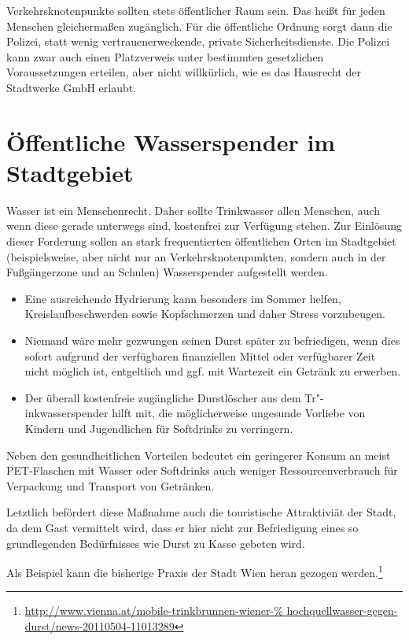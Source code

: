   Verkehrsknotenpunkte sollten stets öffentlicher Raum sein. Das heißt für 
  jeden Menschen gleichermaßen zugänglich. Für die öffentliche Ordnung sorgt 
  dann die Polizei, statt wenig vertrauenerweckende, private
  Sicherheitsdienste. Die Polizei kann zwar auch einen Platzverweis unter 
  bestimmten gesetzlichen Voraussetzungen erteilen, aber nicht willkürlich, 
  wie es das Hausrecht der Stadtwerke GmbH erlaubt.
  
  \section{Öffentliche Wasserspender im Stadtgebiet}
  
  Wasser ist ein Menschenrecht. Daher sollte Trinkwasser allen Menschen, auch 
  wenn diese gerade unterwegs sind, kostenfrei zur Verfügung stehen. Zur 
  Einlösung dieser Forderung sollen an stark frequentierten öffentlichen Orten 
  im Stadtgebiet (beispielsweise, aber nicht nur an Verkehrsknotenpunkten, sondern auch in 
  der Fußgängerzone und an Schulen) Wasserspender aufgestellt werden.
    
  \begin{itemize}
    \item Eine ausreichende Hydrierung kann besonders im Sommer helfen, 
          Kreislaufbeschwerden sowie Kopfschmerzen und daher Stress 
          vorzubeugen.
    \item Niemand wäre mehr gezwungen seinen Durst später zu befriedigen, wenn
          dies sofort aufgrund der verfügbaren finanziellen Mittel oder 
          verfügbarer Zeit nicht möglich ist, entgeltlich und ggf. mit 
          Wartezeit ein Getränk zu erwerben.
    \item Der überall kostenfreie zugängliche Durstlöscher aus dem 
          Tr"-inkwasserspender hilft mit, die möglicherweise ungesunde 
          Vorliebe von Kindern und Jugendlichen für Softdrinks zu verringern. 
  \end{itemize}
  
  Neben den gesundheitlichen Vorteilen bedeutet ein geringerer Konsum an meist 
  PET-Flaschen mit Wasser oder Softdrinks auch weniger Ressourcenverbrauch für 
  Verpackung und Transport von Getränken.
  
  Letztlich befördert diese Maßnahme auch die touristische Attraktiviät der 
  Stadt, da dem Gast vermittelt wird, dass er hier nicht zur Befriedigung 
  eines so grundlegenden Bedürfnisses wie Durst zu Kasse gebeten wird.
  
  Als Beispiel kann die bisherige Praxis der Stadt Wien heran gezogen 
  werden.\footnote{\url{http://www.vienna.at/mobile-trinkbrunnen-wiener-%
      hochquellwasser-gegen-durst/news-20110504-11013289}}
